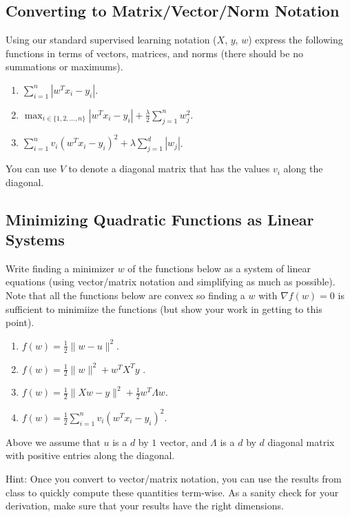 \documentclass{article}
\def\blu#1{{\color{blu}#1}}
\def\norm#1{\|#1\|}
\def\enum#1{\begin{enumerate}#1\end{enumerate}}
\begin{document}
\subsection{Converting to Matrix/Vector/Norm Notation}

Using our standard supervised learning notation ($X$, $y$, $w$)
express the following functions in terms of vectors, matrices, and norms (there should be no summations or maximums).
\blu{\enum{
\item $\sum_{i=1}^n |w^Tx_i - y_i|$.
\item $\max_{i \in \{1,2,\dots,n\}} |w^Tx_i  - y_i| + \frac{\lambda}{2}\sum_{j=1}^n w_j^2$.
\item $\sum_{i=1}^n v_i (w^Tx_i - y_i)^2 + \lambda \sum_{j=1}^{d} |w_j|$.
}}
You can use $V$ to denote a diagonal matrix that has the values $v_i$ along the diagonal.



\subsection{Minimizing Quadratic Functions as Linear Systems}

Write finding a minimizer $w$ of the functions below as a system of linear equations (using vector/matrix notation and simplifying as much as possible). Note that all the functions below are convex  so finding a $w$ with $\nabla f(w) = 0$ is sufficient to minimiize the functions (but show your work in getting to this point).
\blu{\enum{
\item $f(w) = \frac{1}{2}\norm{w-u}^2$.
\item $f(w) = \frac{1}{2}\norm{w}^2 + w^TX^Ty$ .
\item $f(w)= \frac{1}{2}\norm{Xw - y}^2 + \frac{1}{2}w^T\Lambda w$.
\item $f(w) = \frac{1}{2}\sum_{i=1}^n v_i (w^Tx_i - y_i)^2$.
}}
Above we assume that $u$ is a $d$ by $1$ vector, and $\Lambda$ is a $d$ by $d$ diagonal matrix with positive entries along the diagonal.

Hint: Once you convert to vector/matrix notation, you can use the results from class to quickly compute these quantities term-wise. As a sanity check for your derivation, make sure that your results have the right dimensions.



\end{document}
